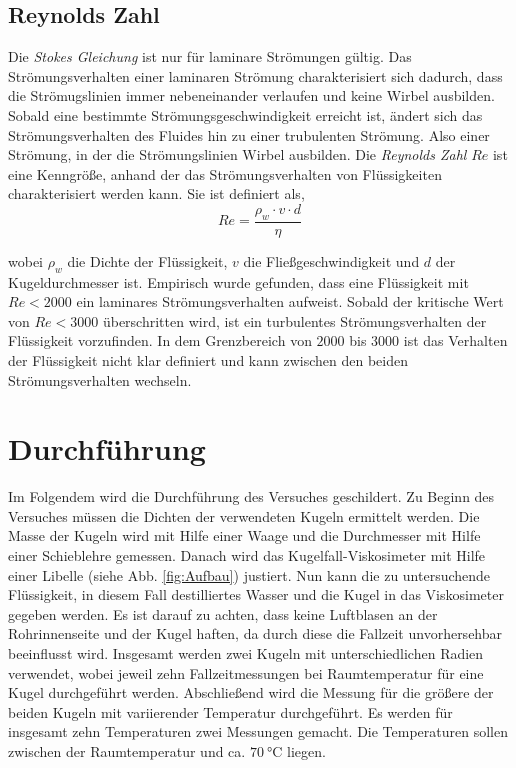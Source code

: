 \subsection{Reynolds Zahl}

Die \emph{Stokes Gleichung} ist nur für laminare Strömungen gültig. Das Strömungsverhalten einer laminaren Strömung charakterisiert sich
dadurch, dass die Strömugslinien immer nebeneinander verlaufen und keine Wirbel ausbilden. Sobald eine bestimmte Strömungsgeschwindigkeit
erreicht ist, ändert sich das Strömungsverhalten des Fluides hin zu einer trubulenten Strömung. Also einer Strömung, in der die Strömungslinien
Wirbel ausbilden. Die \emph{Reynolds Zahl} $Re$ ist eine Kenngröße, anhand der das Strömungsverhalten von Flüssigkeiten charakterisiert werden kann.
Sie ist definiert als,
\begin{equation}
  \label{eqn:Reynolds Zahl}
  Re = \frac{ \rho_{w} \cdot v \cdot d}{\eta}
\end{equation}

wobei $\rho_{w}$ die Dichte der Flüssigkeit, $v$ die Fließgeschwindigkeit und $d$ der Kugeldurchmesser ist.
Empirisch wurde gefunden, dass eine Flüssigkeit mit $Re < 2000$ ein laminares Strömungsverhalten aufweist. Sobald der kritische Wert von $Re < 3000$
überschritten wird, ist ein turbulentes Strömungsverhalten der Flüssigkeit vorzufinden. In dem Grenzbereich von $2000$ bis $3000$ ist das
Verhalten der Flüssigkeit nicht klar definiert und kann zwischen den beiden Strömungsverhalten wechseln.

\section{Durchführung}

Im Folgendem wird die Durchführung des Versuches geschildert.
Zu Beginn des Versuches müssen die Dichten der verwendeten Kugeln ermittelt werden. Die Masse der Kugeln wird mit Hilfe einer Waage und
die Durchmesser mit Hilfe einer Schieblehre gemessen. Danach wird das Kugelfall-Viskosimeter mit Hilfe einer Libelle (siehe Abb. \ref{fig:Aufbau})
justiert. Nun kann die zu untersuchende Flüssigkeit, in diesem Fall destilliertes Wasser und die Kugel in das Viskosimeter gegeben werden.
Es ist darauf zu achten, dass keine Luftblasen an der Rohrinnenseite und der Kugel haften, da durch diese die
Fallzeit unvorhersehbar beeinflusst wird. Insgesamt werden zwei Kugeln mit unterschiedlichen Radien verwendet, wobei jeweil zehn
Fallzeitmessungen bei Raumtemperatur für eine Kugel durchgeführt werden.
Abschließend wird die Messung für die größere der beiden Kugeln mit variierender Temperatur durchgeführt. Es werden für insgesamt
zehn Temperaturen zwei Messungen gemacht. Die Temperaturen sollen zwischen der Raumtemperatur und ca. $\SI{70}{\celsius}$ liegen.


